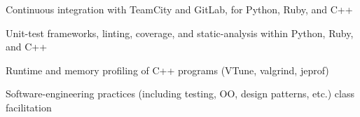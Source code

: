 \begin{plainlist}
	\item Continuous integration with TeamCity and GitLab, for Python, Ruby, and C++
	\item Unit-test frameworks, linting, coverage, and static-analysis within Python, Ruby, and C++
	\item Runtime and memory profiling of C++ programs (VTune, valgrind, jeprof)
	\item Software-engineering practices (including testing, OO, design patterns, etc.) class facilitation
\end{plainlist}
